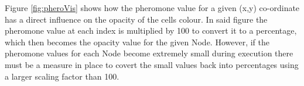 \noindent
Figure \ref{fig:pheroVis} shows how the pheromone value for a given (x,y) co-ordinate has a direct influence on the opacity of the cells colour. In said figure the pheromone value at each index is multiplied by 100 to convert it to a percentage, which then becomes the opacity value for the given Node. However, if the pheromone values for each Node become extremely small during execution there must be a measure in place to covert the small values back into percentages using a larger scaling factor than 100.


\clearpage
